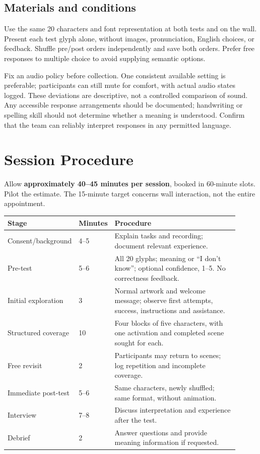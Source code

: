 \documentclass[11pt,letterpaper]{article}
\begin{document}
\subsection{Materials and conditions}
Use the same 20 characters and font representation at both tests and on the wall. Present each test glyph alone, without images, pronunciation, English choices, or feedback. Shuffle pre/post orders independently and save both orders. Prefer free responses to multiple choice to avoid supplying semantic options.

Fix an audio policy before collection. One consistent available setting is preferable; participants can still mute for comfort, with actual audio states logged. These deviations are descriptive, not a controlled comparison of sound. Any accessible response arrangements should be documented; handwriting or spelling skill should not determine whether a meaning is understood. Confirm that the team can reliably interpret responses in any permitted language.

\section{Session Procedure}
Allow \textbf{approximately 40--45 minutes per session}, booked in 60-minute slots. Pilot the estimate. The 15-minute target concerns wall interaction, not the entire appointment.

\begin{longtable}{p{0.26\linewidth}p{0.10\linewidth}p{0.55\linewidth}}
\toprule Stage & Minutes & Procedure \\
\midrule\endhead
Consent/background & 4--5 & Explain tasks and recording; document relevant experience. \\
Pre-test & 5--6 & All 20 glyphs; meaning or ``I don't know''; optional confidence, 1--5. No correctness feedback. \\
Initial exploration & 3 & Normal artwork and welcome message; observe first attempts, success, instructions and assistance. \\
Structured coverage & 10 & Four blocks of five characters, with one activation and completed scene sought for each. \\
Free revisit & 2 & Participants may return to scenes; log repetition and incomplete coverage. \\
Immediate post-test & 5--6 & Same characters, newly shuffled; same format, without animation. \\
Interview & 7--8 & Discuss interpretation and experience after the test. \\
Debrief & 2 & Answer questions and provide meaning information if requested. \\
\bottomrule
\end{longtable}
\end{document}
